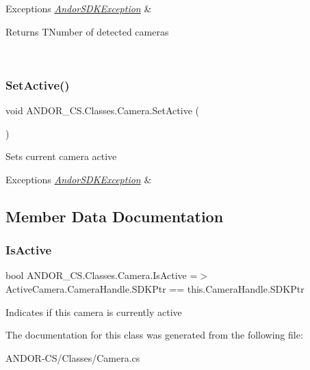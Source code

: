 \begin{DoxyExceptions}{Exceptions}
{\em \hyperlink{class_a_n_d_o_r___c_s_1_1_andor_s_d_k_exception}{Andor\+S\+D\+K\+Exception}} & \begin{DoxyReturn}{Returns}
T\+Number of detected cameras
\end{DoxyReturn}
\\
\hline
\end{DoxyExceptions}
\mbox{\label{class_a_n_d_o_r___c_s_1_1_classes_1_1_camera_a262734b24f4651701e2a52df3b683d75}} 
\subsubsection{\texorpdfstring{Set\+Active()}{SetActive()}}
{\footnotesize\ttfamily void A\+N\+D\+O\+R\+\_\+\+C\+S.\+Classes.\+Camera.\+Set\+Active (\begin{DoxyParamCaption}{ }\end{DoxyParamCaption})}



Sets current camera active 


\begin{DoxyExceptions}{Exceptions}
{\em \hyperlink{class_a_n_d_o_r___c_s_1_1_andor_s_d_k_exception}{Andor\+S\+D\+K\+Exception}} & \\
\hline
\end{DoxyExceptions}


\subsection{Member Data Documentation}
\mbox{\label{class_a_n_d_o_r___c_s_1_1_classes_1_1_camera_a1cac90fda13e8159614d72bc00dff514}} 
\subsubsection{\texorpdfstring{Is\+Active}{IsActive}}
{\footnotesize\ttfamily bool A\+N\+D\+O\+R\+\_\+\+C\+S.\+Classes.\+Camera.\+Is\+Active =$>$ Active\+Camera.\+Camera\+Handle.\+S\+D\+K\+Ptr == this.\+Camera\+Handle.\+S\+D\+K\+Ptr}



Indicates if this camera is currently active 



The documentation for this class was generated from the following file\+:\begin{DoxyCompactItemize}
\item 
A\+N\+D\+O\+R-\/\+C\+S/\+Classes/Camera.\+cs\end{DoxyCompactItemize}
